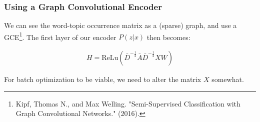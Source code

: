 \documentclass{beamer}
\begin{document}
	\begin{frame}
		\frametitle{Using a Graph Convolutional Encoder}
		We can see the word-topic occurrence matrix as a (sparse) graph, and use a GCE\footnote{Kipf, Thomas N., and Max Welling. "Semi-Supervised Classification with Graph Convolutional Networks." (2016).}. The first layer of our encoder $P(z|x)$ then becomes: 
		
		\begin{align}
		H = \text{ReLu}(\bar{D}^{-\frac{1}{2}}\bar{A}\bar{D}^{-\frac{1}{2}}XW)
		\end{align}
		
		For batch optimization to be viable, we need to alter the matrix $X$ somewhat.
	\end{frame}
		
	
	
\end{document}

